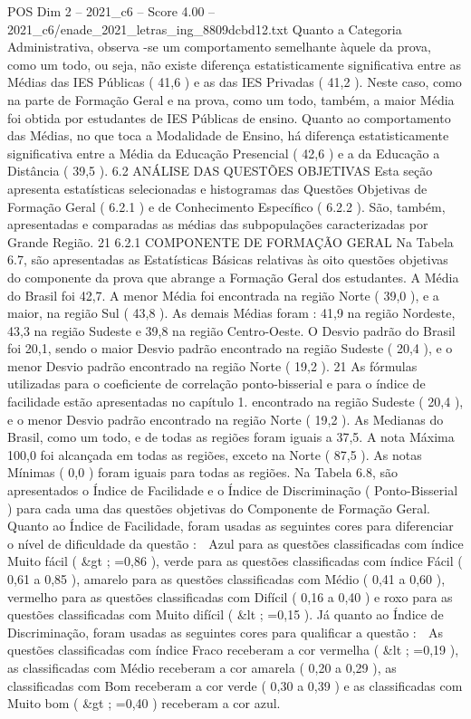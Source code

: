 \begin{textsample}{POS Dim 2 – 2021\_c6 – Score 4.00 – 2021\_c6/enade\_2021\_letras\_ing\_8809dcbd12.txt}
Quanto a Categoria Administrativa, observa -se um comportamento semelhante àquele da prova, como um todo, ou seja, não existe diferença estatisticamente significativa entre as Médias das IES Públicas ( 41,6 ) e as das IES Privadas ( 41,2 ).
Neste caso, como na parte de Formação Geral e na prova, como um todo, também, a maior Média foi obtida por estudantes de IES Públicas de ensino.
Quanto ao comportamento das Médias, no que toca a Modalidade de Ensino, há diferença estatisticamente significativa entre a Média da Educação Presencial ( 42,6 ) e a da Educação a Distância ( 39,5 ). 6.2 ANÁLISE DAS QUESTÕES OBJETIVAS Esta seção apresenta estatísticas selecionadas e histogramas das Questões Objetivas de Formação Geral ( 6.2.1 ) e de Conhecimento Específico ( 6.2.2 ).
São, também, apresentadas e comparadas as médias das subpopulações caracterizadas por Grande Região. 21 6.2.1 COMPONENTE DE FORMAÇÃO GERAL Na Tabela 6.7, são apresentadas as Estatísticas Básicas relativas às oito questões objetivas do componente da prova que abrange a Formação Geral dos estudantes.
A Média do Brasil foi 42,7.
A menor Média foi encontrada na região Norte ( 39,0 ), e a maior, na região Sul ( 43,8 ).
As demais Médias foram : 41,9 na região Nordeste, 43,3 na região Sudeste e 39,8 na região Centro-Oeste.
O Desvio padrão do Brasil foi 20,1, sendo o maior Desvio padrão encontrado na região Sudeste ( 20,4 ), e o menor Desvio padrão encontrado na região Norte ( 19,2 ). 21 As fórmulas utilizadas para o coeficiente de correlação ponto-bisserial e para o índice de facilidade estão apresentadas no capítulo 1. encontrado na região Sudeste ( 20,4 ), e o menor Desvio padrão encontrado na região Norte ( 19,2 ).
As Medianas do Brasil, como um todo, e de todas as regiões foram iguais a 37,5.
A nota Máxima 100,0 foi alcançada em todas as regiões, exceto na Norte ( 87,5 ).
As notas Mínimas ( 0,0 ) foram iguais para todas as regiões.
Na Tabela 6.8, são apresentados o Índice de Facilidade e o Índice de Discriminação ( Ponto-Bisserial ) para cada uma das questões objetivas do Componente de Formação Geral.
Quanto ao Índice de Facilidade, foram usadas as seguintes cores para diferenciar o nível de dificuldade da questão :  Azul para as questões classificadas com índice Muito fácil ( \&gt ; =0,86 ), verde para as questões classificadas com índice Fácil ( 0,61 a 0,85 ), amarelo para as questões classificadas com Médio ( 0,41 a 0,60 ), vermelho para as questões classificadas com Difícil ( 0,16 a 0,40 ) e roxo para as questões classificadas com Muito difícil ( \&lt ; =0,15 ).
Já quanto ao Índice de Discriminação, foram usadas as seguintes cores para qualificar a questão :  As questões classificadas com índice Fraco receberam a cor vermelha ( \&lt ; =0,19 ), as classificadas com Médio receberam a cor amarela ( 0,20 a 0,29 ), as classificadas com Bom receberam a cor verde ( 0,30 a 0,39 ) e as classificadas com Muito bom ( \&gt ; =0,40 ) receberam a cor azul.

\end{textsample}
